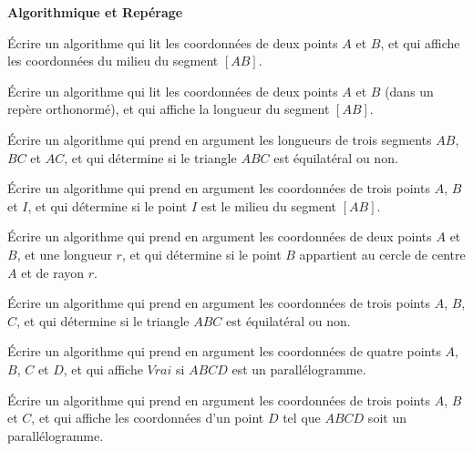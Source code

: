 \documentclass{article}
\begin{document}
\begin{center}
  \textbf{Algorithmique et Repérage}
\end{center}

\begin{exercice}
  Écrire un algorithme qui lit les coordonnées de deux points $A$ et $B$, et qui affiche les coordonnées du milieu du segment $[AB]$.
\end{exercice}

\begin{exercice}
  Écrire un algorithme qui lit les coordonnées de deux points $A$ et $B$ (dans un repère orthonormé), et qui affiche la longueur du segment $[AB]$.
\end{exercice}

\begin{exercice}
Écrire un algorithme qui prend en argument les longueurs de trois segments $AB$, $BC$ et $AC$, et qui détermine si le triangle $ABC$ est équilatéral ou non.
\end{exercice}

\begin{exercice}
  Écrire un algorithme qui prend en argument les coordonnées de trois points $A$, $B$ et $I$, et qui détermine si le point $I$ est le milieu du segment $[AB]$.
\end{exercice}

\begin{exercice}
Écrire un algorithme qui prend en argument les coordonnées de deux points $A$ et $B$, et une longueur $r$, et qui détermine si le point $B$ appartient au cercle de centre $A$ et de rayon $r$.
\end{exercice}

\begin{exercice}
Écrire un algorithme qui prend en argument les coordonnées de trois points $A$, $B$, $C$, et qui détermine si le triangle $ABC$ est équilatéral ou non.
\end{exercice}

\begin{exercice}
Écrire un algorithme qui prend en argument les coordonnées de quatre points $A$, $B$, $C$ et $D$, et qui affiche $Vrai$ si $ABCD$ est un parallélogramme.
\end{exercice}

\begin{exercice}
Écrire un algorithme qui prend en argument les coordonnées de trois points $A$, $B$ et $C$, et qui affiche les coordonnées d'un point $D$ tel que $ABCD$ soit un parallélogramme.
\end{exercice}
\end{document}
